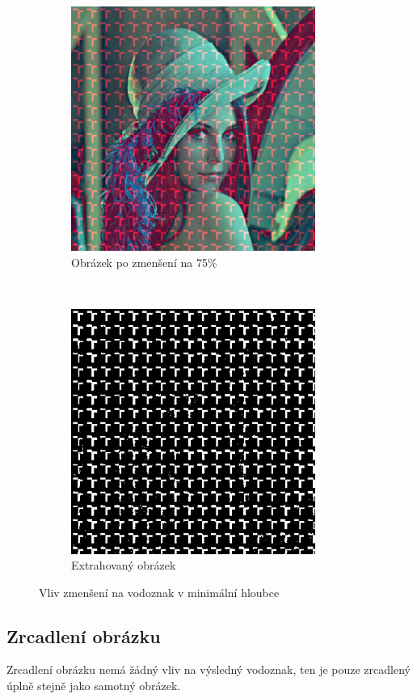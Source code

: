 \begin{figure}[h!]
    \begin{center}
        \begin{subfigure}[t]{0.5\textwidth}
            \centering
            \includegraphics[height=8cm]{images/resize_0_75percent.jpg}
            \caption{Obrázek po zmenšení na 75\%}
        \end{subfigure}%
        ~
        \begin{subfigure}[t]{0.5\textwidth}
            \centering
            \includegraphics[height=8cm]{images/resize_0_75percent_extracted.jpg}
            \caption{Extrahovaný obrázek}
        \end{subfigure}
        \caption{Vliv zmenšení na vodoznak v minimální hloubce}
    \end{center}
\end{figure}

\clearpage
\subsection[zrcadleni]{Zrcadlení obrázku}
Zrcadlení obrázku nemá žádný vliv na výsledný vodoznak, ten je pouze zrcadlený úplně stejně jako samotný obrázek.

